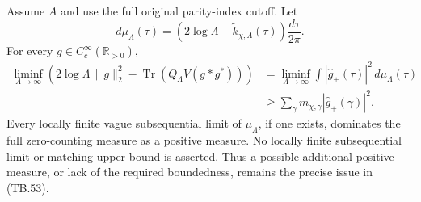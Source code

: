 \begin{theorem}
\label{AC-T31}
Assume \(A\) and use the full original parity-index cutoff.
Let
\[
 d\mu_\Lambda(\tau)=
       (2\log\Lambda-\widetilde k_{\chi,\Lambda}(\tau))
                                                     \frac{d\tau}{2\pi}.
\]
For every \(g\in C_c^\infty(\mathbb R_{>0})\),
\[
 \begin{split}
 \liminf_{\Lambda\to\infty}
 \left(2\log\Lambda\,\|g\|_2^2-
                  \operatorname{Tr}(Q_\Lambda V(g*g^*))\right)
 &=
 \liminf_{\Lambda\to\infty}
                  \int|\widehat g_+(\tau)|^2\,d\mu_\Lambda(\tau)\\
 &\geq\sum_\gamma m_{\chi,\gamma}|\widehat g_+(\gamma)|^2.
 \end{split}
 \tag{TB.55}
\]
Every locally finite vague subsequential limit of
\(\mu_\Lambda\), if one exists, dominates the full
zero-counting measure as a positive measure.
No locally finite subsequential limit or matching upper
bound is asserted.  Thus a possible additional positive
measure, or lack of the required boundedness, remains the
precise issue in (TB.53).
\end{theorem}
